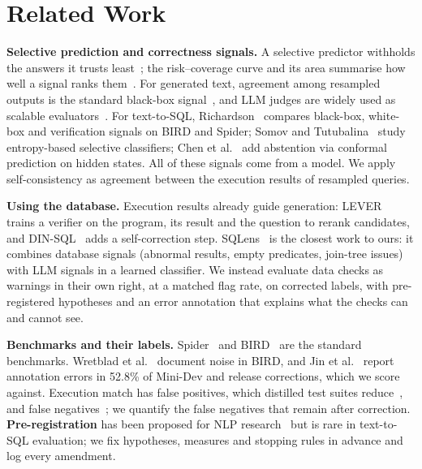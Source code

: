 \documentclass[conference]{IEEEtran}
\begin{document}
\section{Related Work}

\textbf{Selective prediction and correctness signals.} A selective predictor withholds the answers
it trusts least~\cite{geifman2017selective}; the risk--coverage curve and its area summarise how well a
signal ranks them~\cite{geifman2019bias}. For generated text, agreement among resampled outputs is the
standard black-box signal~\cite{wang2023selfconsistency,kuhn2023semantic,manakul2023selfcheckgpt}, and
LLM judges are widely used as scalable evaluators~\cite{zheng2023judging}. For text-to-SQL,
Richardson~\cite{richardson2026predicts} compares black-box, white-box and verification signals on BIRD
and Spider; Somov and Tutubalina~\cite{somov2025confidence} study entropy-based selective classifiers;
Chen et al.~\cite{chen2025abstention} add abstention via conformal prediction on hidden states. All of
these signals come from a model. We apply self-consistency as agreement between the execution results
of resampled queries.

\textbf{Using the database.} Execution results already guide generation: LEVER~\cite{ni2023lever}
trains a verifier on the program, its result and the question to rerank candidates, and
DIN-SQL~\cite{pourreza2023dinsql} adds a self-correction step. SQLens~\cite{gong2025sqlens} is the
closest work to ours: it combines database signals (abnormal results, empty predicates, join-tree
issues) with LLM signals in a learned classifier. We instead evaluate data checks as warnings in their
own right, at a matched flag rate, on corrected labels, with pre-registered hypotheses and an error
annotation that explains what the checks can and cannot see.

\textbf{Benchmarks and their labels.} Spider~\cite{yu2018spider} and BIRD~\cite{li2023bird} are the
standard benchmarks. Wretblad et al.~\cite{wretblad2024noise} document noise in BIRD, and Jin et
al.~\cite{jin2026annotation} report annotation errors in 52.8\% of Mini-Dev and release corrections,
which we score against. Execution match has false positives, which distilled test suites
reduce~\cite{zhong2020semantic}, and false negatives~\cite{pourreza2023evaluating,kim2025flex}; we
quantify the false negatives that remain after correction. \textbf{Pre-registration} has been
proposed for NLP research~\cite{vanmiltenburg2021preregistering} but is rare in text-to-SQL
evaluation; we fix hypotheses, measures and stopping rules in advance and log every amendment.
\end{document}
